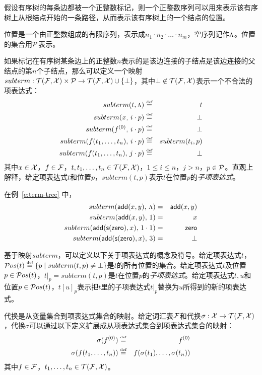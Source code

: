 假设有序树的每条边都被一个正整数标记，则一个正整数序列可以用来表示该有序树上从根结点开始的一条路径，从而表示该有序树上的一个结点的位置。

\begin{definition}[位置]
位置是一个由正整数组成的有限序列，表示成$n_1\cdot n_2\cdot\ldots\cdot n_m$，空序列记作$\mbox {\footnotesize $\Lambda$}$。位置的集合用$\mathcal{P}$表示。
\end{definition}

如果标记在有序树某条边上的正整数$n$表示的是该边连接的子结点是该边连接的父结点的第$n$个子结点，那么可以定义一个映射$subterm : \mathcal{T}(\mathcal{F},\mathcal{X}) \times \mathcal{P} \rightarrow \mathcal{T}(\mathcal{F},\mathcal{X})\cup\{\bot\}$，其中$\bot\not\in\mathcal{T}(\mathcal{F},\mathcal{X})$表示一个不合法的项表达式：
\begin{eqnarray}
  subterm(t, \mbox {\footnotesize $\Lambda$}) & \stackrel{\text{\tiny def}}{=} & t  \nonumber \\
  subterm(x,\, i\cdot p) & \stackrel{\text{\tiny def}}{=} & \bot  \nonumber \\
  subterm(f^{(0)},\, i\cdot p) & \stackrel{\text{\tiny def}}{=} & \bot  \nonumber \\
  subterm(f(t_1,\ldots,t_n),\, i\cdot p) & \stackrel{\text{\tiny def}}{=} & subterm(t_i, p) \nonumber \\
  subterm(f(t_1,\ldots,t_n),\, j\cdot p) & \stackrel{\text{\tiny def}}{=} & \bot \nonumber
\end{eqnarray}
其中$x\in\mathcal{X}$，$f\in\mathcal{F}$，$t,t_1,\ldots,t_n\in\mathcal{T}(\mathcal{F},\mathcal{X})$，$1\le i\le n$，$j > n$，$p\in\mathcal{P}$。直观上解释，给定项表达式$t$和位置$p$，$subterm(t,p)$表示$t$在位置$p$的\emph{子项表达式}。

\begin{example}
在例~\ref{e:term-tree} 中，
\begin{eqnarray}
  subterm(\operatorname{\mathsf{add}}(x,y),\, \mbox {\footnotesize $\Lambda$}) & = & \operatorname{\mathsf{add}}(x,y)  \nonumber \\
  subterm(\operatorname{\mathsf{add}}(x,y),\, 1) & = & x \nonumber \\
  subterm(\operatorname{\mathsf{add}}(\operatorname{\mathsf{s}}(\operatorname{\mathsf{zero}}),x),\, 1\cdot 1) & = & \operatorname{\mathsf{zero}}  \nonumber \\
  subterm(\operatorname{\mathsf{add}}(\operatorname{\mathsf{s}}(\operatorname{\mathsf{zero}}),x),\, 3) & = & \bot  \nonumber
\end{eqnarray}
\end{example}

基于映射$subterm$，可以定义以下关于项表达式的概念及符号。给定项表达式$t$，$\mathcal{P}os({t})\stackrel{\text{\tiny def}}{=} \{p\mid subterm(t,p)\not=\bot\}$是$t$的所有位置的集合。给定项表达式$t$及位置$p \in \mathcal{P}os({t})$，$t|_p = subterm(t,p)$是$t$在位置$p$的\emph{子项表达式}。给定项表达式$t,u$和位置$p\in\mathcal{P}os({t})$，$t[u]_p$表示把$t$里的子项表达式$t|_p$替换为$u$所得到的新的项表达式。

\begin{definition}[代换]
代换是从变量集合到项表达式集合的映射。给定词汇表$\mathcal{F}$和代换$\sigma : \mathcal{X} \rightarrow \mathcal{T}(\mathcal{F},\mathcal{X})$，代换$\sigma$可以通过以下定义扩展成从项表达式集合到项表达式集合的映射：
\begin{eqnarray}
  \sigma(f^{(0)}) & \stackrel{\text{\tiny def}}{=} & f^{(0)}  \nonumber \\
  \sigma(f(t_1,\ldots,t_n)) & \stackrel{\text{\tiny def}}{=} & f(\sigma(t_1),\ldots,\sigma(t_n)) \nonumber
\end{eqnarray}
其中$f\in\mathcal{F}$，$t_1,\ldots,t_n\in\mathcal{T}(\mathcal{F},\mathcal{X})$。
\end{definition}

